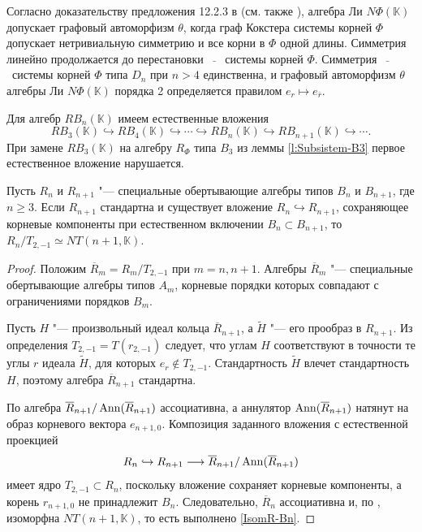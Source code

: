 \documentclass[a4paper,14pt,oneside,openany]{memoir}
\begin{document}
\begin{remark}\label{remark:graph-automorphisms}
    Согласно доказательству предложения 12.2.3 в \cite{carter72} (см. также
    \cite{vl90a_ru}), алгебра Ли $N\Phi (\mathbb{K})$ допускает графовый
    автоморфизм $\theta$, когда граф Кокстера системы корней $\Phi$ допускает
    нетривиальную симметрию и все корни в $\Phi$ одной длины. Симметрия линейно
    продолжается до перестановки \ $\bar {}$ \ системы корней $\Phi$. Симметрия \
    $\bar {}$ \ системы корней $\Phi$ типа $D_{n}$ при $n>4$ единственна, и
    графовый автоморфизм $\theta$ алгебры Ли $N\Phi(\mathbb{K})$ порядка 2
    определяется правилом $e_r \mapsto e_{\bar {r}}$.
\end{remark}

Для алгебр $RB_n(\mathbb{K})$ имеем естественные вложения
%
\begin{equation*}%
    RB_3(\mathbb{K})\hookrightarrow RB_4(\mathbb{K})\hookrightarrow \cdots \hookrightarrow RB_n(\mathbb{K})\hookrightarrow
    RB_{n+1}(\mathbb{K}) \hookrightarrow \cdots .
\end{equation*}
%
При замене $RB_3(\mathbb{K})$ на алгебру $R_{\Phi}$ типа $B_3$ из леммы
\ref{l:Subsistem-B3} первое естественное вложение нарушается.

\begin{lemma}\label{l:Bn-factor-from-embedding}
    Пусть $R_n$ и $R_{n+1}$ "--- специальные обертывающие алгебры типов $B_n$ и
    $B_{n+1}$, где $n\geq3$. Если $R_{n+1}$ стандартна и существует вложение
    $R_n\hookrightarrow R_{n+1}$, сохраняющее корневые компоненты при естественном
    включении $B_n\subset B_{n+1}$, то $R_n/T_{2,-1}\simeq NT(n+1,\mathbb{K})$.
\end{lemma}

\begin{proof}
    Положим $\overline R_m=R_m/T_{2,-1}$ при $m=n,n+1$. Алгебры $\overline R_m$
    "--- специальные обертывающие алгебры типов $A_m$, корневые порядки которых
    совпадают с ограничениями порядков $B_m$.

    Пусть $H$ "--- произвольный идеал кольца $\overline R_{n+1}$, а $\widetilde H$
    "--- его прообраз в $R_{n+1}$. Из определения $T_{2,-1}=T(r_{2,-1})$ следует,
    что углам $H$ соответствуют в точности те углы $r$ идеала $\widetilde H$, для
    которых $e_r\notin T_{2,-1}$. Стандартность $\widetilde H$ влечет стандартность
    $H$, поэтому алгебра $\overline R_{n+1}$ стандартна.

    По  алгебра $\overline R_{n+1}/\operatorname{Ann}(\overline R_{n+1})$
    ассоциативна, а аннулятор $\operatorname{Ann}(\overline R_{n+1})$ натянут на образ корневого
    вектора $e_{n+1,0}$. Композиция заданного вложения с естественной проекцией
    \[
        R_n\hookrightarrow R_{n+1}\longrightarrow
        \overline R_{n+1}/\operatorname{Ann}(\overline R_{n+1})
    \]
    имеет ядро $T_{2,-1}\subset R_n$, поскольку вложение сохраняет корневые
    компоненты, а корень $r_{n+1,0}$ не принадлежит $B_n$. Следовательно,
    $\overline R_n$ ассоциативна и, по \crefDat{th:Stand-Graded-An}, изоморфна
    $NT(n+1,\mathbb{K})$, то есть выполнено \eqref{IsomR-Bn}.
\end{proof}
\end{document}
